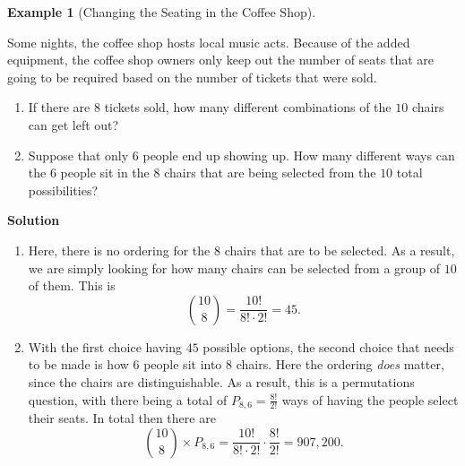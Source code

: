 \documentclass[
  letterpaper,
  DIV=11,
  numbers=noendperiod]{scrreprt}
\providecommand{\tightlist}{%
  \setlength{\itemsep}{0pt}\setlength{\parskip}{0pt}}\usepackage{longtable,booktabs,array}
\theoremstyle{definition}
\theoremstyle{definition}
\newtheorem{example}{Example}[chapter]
\theoremstyle{definition}
\theoremstyle{remark}
\begin{document}
\begin{example}[Changing the Seating in the Coffee
Shop]\protect\hypertarget{exm-combinations}{}\label{exm-combinations}

Some nights, the coffee shop hosts local music acts. Because of the
added equipment, the coffee shop owners only keep out the number of
seats that are going to be required based on the number of tickets that
were sold.

\begin{enumerate}
\def\labelenumi{\alph{enumi}.}
\tightlist
\item
  If there are \(8\) tickets sold, how many different combinations of
  the \(10\) chairs can get left out?
\item
  Suppose that only \(6\) people end up showing up. How many different
  ways can the \(6\) people sit in the \(8\) chairs that are being
  selected from the \(10\) total possibilities?
\end{enumerate}

\begin{tcolorbox}[enhanced jigsaw, colback=white, colframe=quarto-callout-color-frame, arc=.35mm, leftrule=.75mm, rightrule=.15mm, opacityback=0, breakable, bottomrule=.15mm, left=2mm, toprule=.15mm]

\vspace{-3mm}\textbf{Solution}\vspace{3mm}

\begin{enumerate}
\def\labelenumi{\alph{enumi}.}
\item
  Here, there is no ordering for the \(8\) chairs that are to be
  selected. As a result, we are simply looking for how many chairs can
  be selected from a group of \(10\) of them. This is
  \[\binom{10}{8} = \frac{10!}{8!\cdot 2!} = 45.\]
\item
  With the first choice having \(45\) possible options, the second
  choice that needs to be made is how \(6\) people sit into \(8\)
  chairs. Here the ordering \emph{does} matter, since the chairs are
  distinguishable. As a result, this is a permutations question, with
  there being a total of \(P_{8,6} = \frac{8!}{2!}\) ways of having the
  people select their seats. In total then there are
  \[\binom{10}{8}\times P_{8,6} = \frac{10!}{8!\cdot 2!}\cdot\frac{8!}{2!} = 907,200.\]
\end{enumerate}

\end{tcolorbox}

\end{example}
\end{document}
